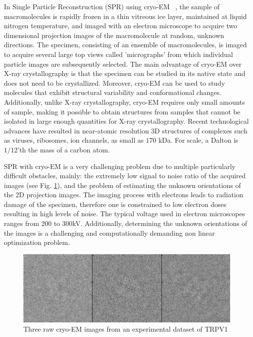 In Single Particle Reconstruction (SPR) using cryo-EM ~\cite{Frank1,Kuhlbrandt1443,cryoem_rev, nogales}, the sample of macromolecules is rapidly frozen in a thin vitreous ice layer, maintained at liquid nitrogen temperature, and imaged with an electron microscope to acquire two dimensional projection images of the macromolecule at random, unknown directions. The specimen, consisting of an ensemble of macromolecules, is imaged to acquire several large top views called 'micrographs' from which individual particle images are subsequently selected. The main advantage of cryo-EM over X-ray crystallography is that the specimen can be studied in its native state and does not need to be crystallized. Moreover, cryo-EM can be used to study molecules that exhibit structural variability and conformational changes. Additionally, unlike X-ray crystallography, cryo-EM requires only small amounts of sample, making it possible to obtain structures from samples that cannot be isolated in large enough quantities for X-ray crystallography. Recent technological advances have resulted in near-atomic resolution 3D structures of complexes such as viruses, ribosomes, ion channels, as small as $170$ kDa. For scale, a Dalton is $1/12$'th the mass of a carbon atom. 

SPR with cryo-EM is a very challenging problem due to multiple particularly difficult obstacles, mainly: the extremely low signal to noise ratio of the acquired images (see Fig. \ref{fig:raw_expt_images}), and the problem of estimating the unknown orientations of the 2D projection images. The imaging process with electrons leads to radiation damage of the specimen, therefore one is constrained to low electron doses resulting in high levels of noise. The typical voltage used in electron microscopes ranges from $200$ to $300$kV. Additionally, determining the unknown orientations of the images is a challenging and computationally demanding non linear optimization problem.

\begin{figure}[t]
\begin{center}
\includegraphics[width=.99\columnwidth]{figures/raw_expt_images.png}
\end{center}
\caption{Three raw cryo-EM images from an experimental dataset of TRPV1 \cite{trpv1_nature}}
\label{fig:raw_expt_images}
\end{figure}


